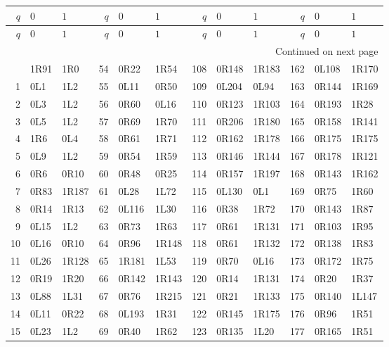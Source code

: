 \begingroup\fontsize{8.5}{10}\selectfont\ttfamily
\setlength{\tabcolsep}{4pt}
\begin{longtable}{rll@{\hspace{1em}}rll@{\hspace{1em}}rll@{\hspace{1em}}rll}
\toprule
$q$ & $0$ & $1$ & $q$ & $0$ & $1$ & $q$ & $0$ & $1$ & $q$ & $0$ & $1$\\
\midrule
\endfirsthead
\toprule
$q$ & $0$ & $1$ & $q$ & $0$ & $1$ & $q$ & $0$ & $1$ & $q$ & $0$ & $1$\\
\midrule
\endhead
\midrule
\multicolumn{12}{r}{\normalfont\footnotesize Continued on next page}\\
\endfoot
\bottomrule
\endlastfoot
0 & 1R91 & 1R0 & 54 & 0R22 & 1R54 & 108 & 0R148 & 1R183 & 162 & 0L108 & 1R170\\
1 & 0L1 & 1L2 & 55 & 0L11 & 0R50 & 109 & 0L204 & 0L94 & 163 & 0R144 & 1R169\\
2 & 0L3 & 1L2 & 56 & 0R60 & 0L16 & 110 & 0R123 & 1R103 & 164 & 0R193 & 1R28\\
3 & 0L5 & 1L2 & 57 & 0R69 & 1R70 & 111 & 0R206 & 1R180 & 165 & 0R158 & 1R141\\
4 & 1R6 & 0L4 & 58 & 0R61 & 1R71 & 112 & 0R162 & 1R178 & 166 & 0R175 & 1R175\\
5 & 0L9 & 1L2 & 59 & 0R54 & 1R59 & 113 & 0R146 & 1R144 & 167 & 0R178 & 1R121\\
6 & 0R6 & 0R10 & 60 & 0R48 & 0R25 & 114 & 0R157 & 1R197 & 168 & 0R143 & 1R162\\
7 & 0R83 & 1R187 & 61 & 0L28 & 1L72 & 115 & 0L130 & 0L1 & 169 & 0R75 & 1R60\\
8 & 0R14 & 1R13 & 62 & 0L116 & 1L30 & 116 & 0R38 & 1R72 & 170 & 0R143 & 1R87\\
9 & 0L15 & 1L2 & 63 & 0R73 & 1R63 & 117 & 0R61 & 1R131 & 171 & 0R103 & 1R95\\
10 & 0L16 & 0R10 & 64 & 0R96 & 1R148 & 118 & 0R61 & 1R132 & 172 & 0R138 & 1R83\\
11 & 0L26 & 1R128 & 65 & 1R181 & 1L53 & 119 & 0R70 & 0L16 & 173 & 0R172 & 1R75\\
12 & 0R19 & 1R20 & 66 & 0R142 & 1R143 & 120 & 0R14 & 1R131 & 174 & 0R20 & 1R37\\
13 & 0L88 & 1L31 & 67 & 0R76 & 1R215 & 121 & 0R21 & 1R133 & 175 & 0R140 & 1L147\\
14 & 0L11 & 0R22 & 68 & 0L193 & 1R31 & 122 & 0R145 & 1R175 & 176 & 0R96 & 1R51\\
15 & 0L23 & 1L2 & 69 & 0R40 & 1R62 & 123 & 0R135 & 1L20 & 177 & 0R165 & 1R51\\

\end{longtable}
